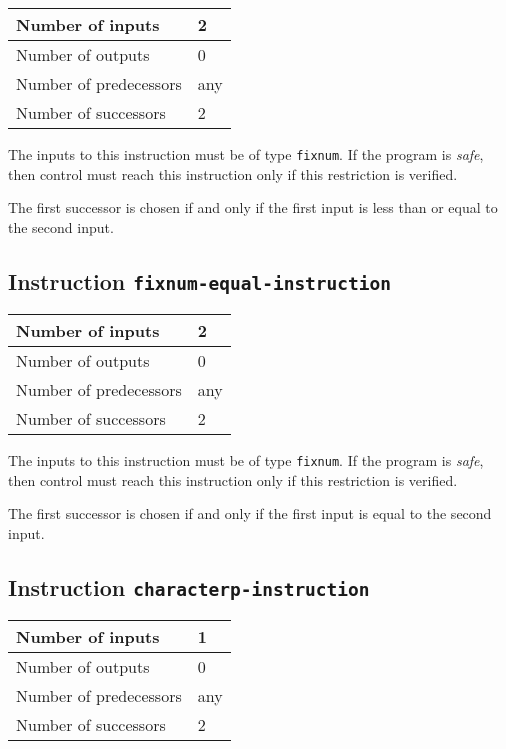 \begin{tabular}{|l|l|}
\hline
Number of inputs & 2\\
\hline
Number of outputs & 0\\
\hline
Number of predecessors & any\\
\hline
Number of successors & 2\\
\hline
\end{tabular}

The inputs to this instruction must be of type \texttt{fixnum}.  If
the program is \emph{safe}, then control must reach this instruction
only if this restriction is verified.

The first successor is chosen if and only if the first input is
less than or equal to the second input.

\subsection{Instruction \texttt{fixnum-equal-instruction}}
\label{hir-instruction-fixnum-equal}

\begin{tabular}{|l|l|}
\hline
Number of inputs & 2\\
\hline
Number of outputs & 0\\
\hline
Number of predecessors & any\\
\hline
Number of successors & 2\\
\hline
\end{tabular}

The inputs to this instruction must be of type \texttt{fixnum}.  If
the program is \emph{safe}, then control must reach this instruction
only if this restriction is verified.

The first successor is chosen if and only if the first input is equal
to the second input.

\subsection{Instruction \texttt{characterp-instruction}}
\label{hir-instruction-car}

\begin{tabular}{|l|l|}
\hline
Number of inputs & 1\\
\hline
Number of outputs & 0\\
\hline
Number of predecessors & any\\
\hline
Number of successors & 2\\
\hline
\end{tabular}

